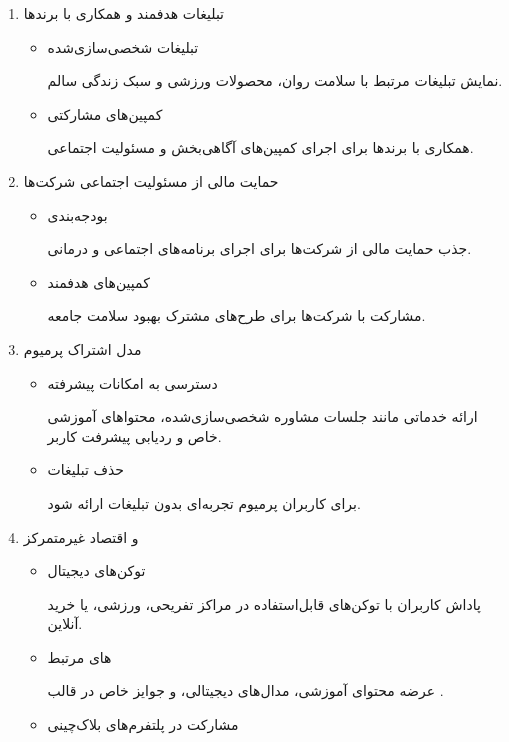 \documentclass[dvipsnames, svgnames, x11names, 11pt]{article}
\begin{document}
\begin{itemize}
\begin{enumerate}
\item 
تبلیغات هدفمند و همکاری با برندها  

\begin{itemize}
\item 
تبلیغات شخصی‌سازی‌شده

نمایش تبلیغات مرتبط با سلامت روان، محصولات ورزشی و سبک زندگی سالم.  

\item 
کمپین‌های مشارکتی

همکاری با برندها برای اجرای کمپین‌های آگاهی‌بخش و مسئولیت اجتماعی.  
\end{itemize}

\item 
حمایت مالی از مسئولیت اجتماعی شرکت‌ها   
\begin{itemize}
\item 
بودجه‌بندی 

جذب حمایت مالی از شرکت‌ها برای اجرای برنامه‌های اجتماعی و درمانی.  

\item 
کمپین‌های هدفمند

مشارکت با شرکت‌ها برای طرح‌های مشترک بهبود سلامت جامعه.  
\end{itemize}

\item 
مدل اشتراک پرمیوم   
\begin{itemize}
\item 
دسترسی به امکانات پیشرفته

ارائه خدماتی مانند جلسات مشاوره شخصی‌سازی‌شده، محتواهای آموزشی خاص و ردیابی پیشرفت کاربر.  

\item 
حذف تبلیغات

برای کاربران پرمیوم تجربه‌ای بدون تبلیغات ارائه شود.  
\end{itemize}

\item 
{}
 و اقتصاد غیرمتمرکز  
\begin{itemize}
\item 
توکن‌های دیجیتال

پاداش کاربران با توکن‌های قابل‌استفاده در مراکز تفریحی، ورزشی، یا خرید آنلاین.  

\item 
{}
‌های مرتبط

عرضه محتوای آموزشی، مدال‌های دیجیتالی، و جوایز خاص در قالب .  

\item 
مشارکت در پلتفرم‌های بلاک‌چینی


\end{itemize}
\end{enumerate}
\end{itemize}
\end{document}
